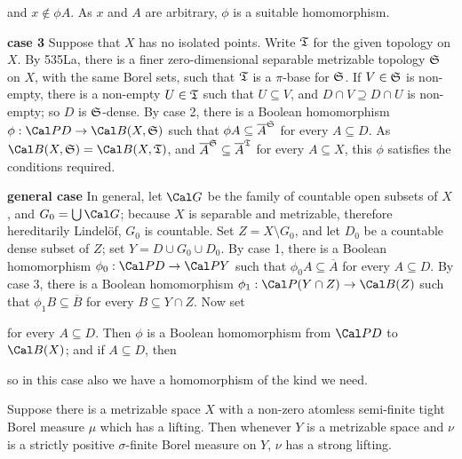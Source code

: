 {

\noindent and $x\notin\phi A$.   As $x$ and $A$ are arbitrary, $\phi$ is
a suitable homomorphism.

\medskip

{\bf case 3} Suppose that $X$ has no isolated points.   Write $\frak T$
for the given topology on $X$.   By 535La, there is a finer
zero-dimensional separable metrizable topology $\frak S$ on $X$, with
the same Borel sets, such that $\frak T$ is a $\pi$-base for $\frak S$.
If $V\in\frak S$ is non-empty, there is a non-empty $U\in\frak T$ such
that $U\subseteq V$, and $D\cap V\supseteq D\cap U$ is non-empty;  so
$D$ is $\frak S$-dense.   By case 2, there is a Boolean homomorphism
$\phi:\Cal PD\to\Cal B(X,\frak S)$ such that
$\phi A\subseteq\overline{A}^{\frak S}$ for every $A\subseteq D$.   As
$\Cal B(X,\frak S)=\Cal B(X,\frak T)$, and
$\overline{A}^{\frak S}\subseteq\overline{A}^{\frak T}$ for every
$A\subseteq X$, this $\phi$ satisfies the conditions required.

\medskip

{\bf general case} In general, let $\Cal G$ be the family of countable
open subsets of $X$, and $G_0=\bigcup\Cal G$;  because $X$ is separable
and metrizable, therefore hereditarily Lindel\"of, $G_0$ is countable.
Set $Z=X\setminus G_0$, and let $D_0$ be a countable dense subset of
$Z$;  set $Y=D\cup G_0\cup D_0$.   By case 1, there is a Boolean
homomorphism $\phi_0:\Cal PD\to\Cal PY$ such that
$\phi_0A\subseteq\overline{A}$ for every $A\subseteq D$.   By case 3,
there is a Boolean homomorphism $\phi_1:\Cal P(Y\cap Z)\to\Cal B(Z)$
such that $\phi_1B\subseteq\overline{B}$ for every $B\subseteq Y\cap Z$.
Now set


\noindent for every $A\subseteq D$.   Then $\phi$ is a Boolean
homomorphism from $\Cal PD$ to $\Cal B(X)$;  and if
$A\subseteq D$, then


\noindent so in this case also we have a homomorphism of the kind we
need.
}%

 Suppose there is a metrizable space $X$ with
a non-zero atomless semi-finite
tight Borel measure $\mu$ which has a lifting.
Then whenever $Y$ is a metrizable space and $\nu$ is a strictly positive
$\sigma$-finite Borel measure on $Y$, $\nu$ has a strong lifting.

